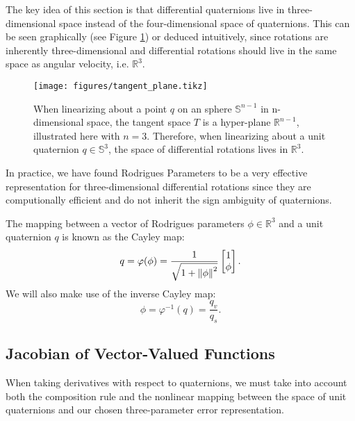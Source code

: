 \documentclass[letterpaper, 10 pt, conference]{ieeeconf}  %
\newcommand{\R}{\mathbb{R}}
\newcommand{\Q}{\mathbb{S}^3}
\begin{document}
    The key idea of this section is that differential quaternions live in three-dimensional
    space instead of the four-dimensional space of quaternions. This can be seen graphically
    (see Figure \ref{fig:tangent_plane}) or deduced intuitively, since rotations are
    inherently three-dimensional and differential rotations should live in the same space as 
    angular velocity, i.e. $\R^3$.

    \begin{figure}
        \centering
        \texttt{[image: figures/tangent\_plane.tikz]}
        \caption{
            When linearizing about a point $q$ on an sphere $\mathbb{S}^{n-1}$ in 
            n-dimensional space, the tangent space $T$ is a hyper-plane $\R^{n-1}$, 
            illustrated here with $n=3$. Therefore, when linearizing about a unit 
            quaternion $q \in \Q$, the space of differential rotations lives in $\R^3$.
        }
        \label{fig:tangent_plane}
    \end{figure}
    In practice, we have found Rodrigues Parameters to be a very effective representation
    for three-dimensional differential rotations since they are computionally efficient
    and do not inherit the sign ambiguity of quaternions.
    
    The mapping between a vector of Rodrigues parameters $\phi \in \R^3$ and a unit
    quaternion $q$ is known as the Cayley map:
    \begin{equation} \label{eq:cayley}
        q = \varphi(\phi) = \frac{1}{\sqrt{1 + \norm{\phi}^2}} \begin{bmatrix} 1 \\ \phi \end{bmatrix}.
    \end{equation}
    We will also make use of the inverse Cayley map:
    \begin{equation} \label{eq:invcayley}
        \phi = \varphi^{-1}(q) = \frac{q_v}{q_s}.
    \end{equation}

    \subsection{Jacobian of Vector-Valued Functions}
        When taking derivatives with respect to quaternions, we must take into account
        both the composition rule and the nonlinear mapping between the space of unit
        quaternions and our chosen three-parameter error representation.
\end{document}
